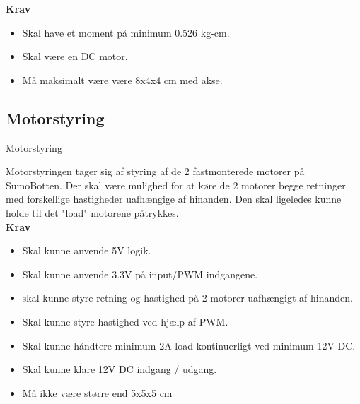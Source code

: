 \textbf{Krav}
\begin{itemize}
\item Skal have et moment på minimum 0.526 kg-cm.
\item Skal være en DC motor.
\item Må maksimalt være være 8x4x4 cm med akse.
\end{itemize}

\subsection{Motorstyring}

\begin{PartBlokDescription}{Motorstyring}{}

\end{PartBlokDescription}

Motorstyringen tager sig af styring af de 2 fastmonterede motorer på SumoBotten. Der skal være mulighed for at køre de 2 motorer begge retninger med forskellige hastigheder uafhængige af hinanden. Den skal ligeledes kunne holde til det "load" motorene påtrykkes.
\\
\textbf{Krav}
\begin{itemize}
\item Skal kunne anvende 5V logik.
\item Skal kunne anvende 3.3V på input/PWM indgangene.
\item skal kunne styre retning og hastighed på 2 motorer uafhængigt af hinanden.
\item Skal kunne styre hastighed ved hjælp af PWM.
\item Skal kunne håndtere minimum 2A load kontinuerligt ved minimum 12V DC.
\item Skal kunne klare 12V DC indgang / udgang. 
\item Må ikke være større end 5x5x5 cm
\end{itemize}



